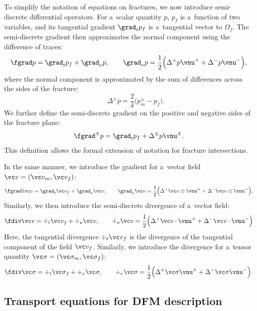 To simplify the notation of equations on fractures, we now introduce semi-discrete differential operators. For a~scalar quantity $p$, $p_f$ is a~function of two variables, and its tangential gradient $\grad_t p_f$ is a~tangential vector to $\Omega_f$. The semi-discrete gradient then approximates the normal component using the difference of traces:
$$
\fgrad p = \grad_t p_f + \grad_\nu p,\qquad 
\grad_\nu p = \frac{1}{2}\Big(\Delta^+ p\vnu^+  + \Delta^- p\vnu^-\Big),
$$
where the normal component is approximated by the sum of differences across the sides of the fracture:
$$
\qquad \Delta^\pm p = \frac{2}{\delta}\Big(p_m^\pm - p_f\Big).
$$
We further define the semi-discrete gradient on the positive and negative sides of the fracture plane:
$$ \fgrad^\pm p = \grad_t p_f + \Delta^\pm p\vnu^\pm. $$
This definition allows the formal extension of notation for fracture intersections.

In the same manner, we introduce the gradient for a~vector field $\vc v=(\vc v_m, \vc v_f)$:
$$
\fgrad \vc v = \grad_t \vc v_f + \grad_\nu \vc v,\qquad 
\grad_\nu \vc v = \frac{1}{2}\Big(\Delta^+\vc v \otimes\vnu^+  + \Delta^- \vc v\otimes\vnu^-\Big),
$$
Similarly, we then introduce the semi-discrete divergence of a~vector field:
$$
\fdiv \vc v = \div_t \vc v_f + \div_\nu \vc v,\qquad
\div_\nu \vc v = \frac{1}{2}\Big(\Delta^+ \vc v \cdot \vnu^+  + \Delta^- \vc v \cdot \vnu^-\Big)
$$
Here, the tangential divergence $\div_t \vc v_f$ is the divergence of the tangential component of the field $\vc v_f$. Similarly, we introduce the divergence for a~tensor quantity $\vc\sigma = (\vc\sigma_m, \vc\sigma_f)$:
$$
\fdiv \vc\sigma = \div_t \vc\sigma_f + \div_\nu \vc\sigma,\qquad
\div_\nu \vc\sigma = \frac{1}{2}\Big(\Delta^+ \vc\sigma \vnu^+  + \Delta^- \vc\sigma \vnu^-\Big).
$$


\subsection{Transport equations for DFM description}
\label{sec:transport_DFN}

